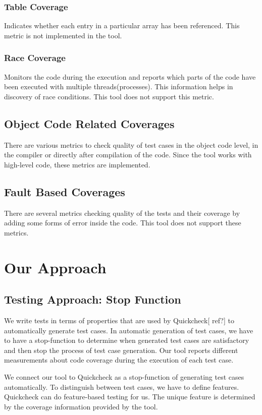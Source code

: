 \documentclass[12pt,a4paper]{report}
\begin{document}
\subsection{Table Coverage}
Indicates whether each entry in a particular array has been referenced.\cite{andersson2005automatic}
This metric is not implemented in the tool.

\subsection{Race Coverage}
Monitors the code during the execution and reports which parts of the code have been executed with multiple threads(processes). This information helps in
 discovery of race conditions. This tool does not support this metric.

\section{Object Code Related Coverages}
There are various metrics to check quality of test cases in the object code level, in the compiler or directly after compilation of the code. Since the tool
 works with high-level code, these metrics are implemented.

\section{Fault Based Coverages}
There are several metrics checking quality of the tests and their coverage by adding some forms of error inside the code. This tool does not support these
 metrics.

\chapter{Our Approach}
\newpage
\section{Testing Approach: Stop Function}
We write tests in terms of properties that are used by Quickcheck[ ref?] to automatically generate test cases. In automatic generation of test cases, we
 have to have a stop-function to determine when generated test cases are satisfactory and then stop the process of test case generation. Our tool reports
 different measurements about code coverage during the execution of each test case. 

We connect our tool to Quickcheck as a stop-function of generating test cases automatically. To distinguish between test cases, we have to define features.
 Quickcheck can do feature-based testing for us. The unique feature is determined by the coverage information provided by the tool.
\end{document}
